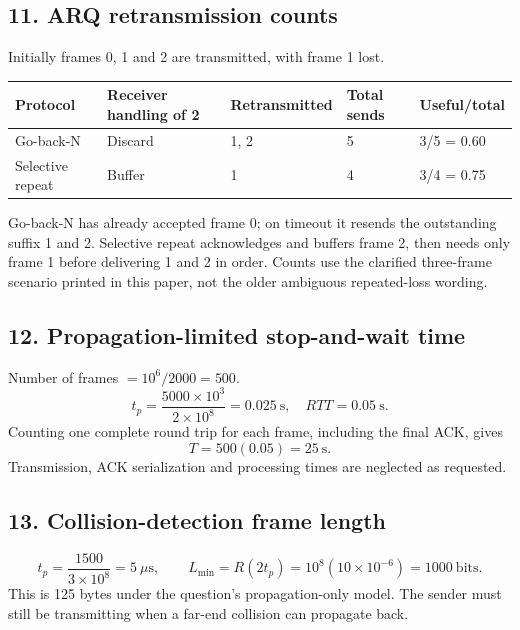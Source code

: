 \documentclass[11pt,a4paper]{article}
\begin{document}
\noindent\begin{minipage}{\linewidth}\subsection*{11. ARQ retransmission counts}

Initially frames 0, 1 and 2 are transmitted, with frame 1 lost.
\begin{center}\renewcommand{\arraystretch}{1.2}\begin{tabular}{lllll}\hline Protocol & Receiver handling of 2 & Retransmitted & Total sends & Useful/total\\\hline
Go-back-N & Discard & 1, 2 & 5 & 3/5 = 0.60\\
Selective repeat & Buffer & 1 & 4 & 3/4 = 0.75\\\hline\end{tabular}\end{center}Go-back-N has already accepted frame 0; on timeout it resends the outstanding suffix 1 and 2. Selective repeat acknowledges and buffers frame 2, then needs only frame 1 before delivering 1 and 2 in order. Counts use the clarified three-frame scenario printed in this paper, not the older ambiguous repeated-loss wording.
\end{minipage}\par\medskip
\noindent\begin{minipage}{\linewidth}\subsection*{12. Propagation-limited stop-and-wait time}

Number of frames $=10^6/2000=500$.
\[t_p=\frac{5000\times10^3}{2\times10^8}=0.025\ \mathrm{s},\quad
RTT=0.05\ \mathrm{s}.\]
Counting one complete round trip for each frame, including the final ACK, gives
\[T=500(0.05)=\boxed{25\ \mathrm{s}}.\]
Transmission, ACK serialization and processing times are neglected as requested.
\end{minipage}\par\medskip
\noindent\begin{minipage}{\linewidth}\subsection*{13. Collision-detection frame length}

\[t_p=\frac{1500}{3\times10^8}=5\ \mu\mathrm{s},\qquad
L_{\min}=R(2t_p)=10^8(10\times10^{-6})=\boxed{1000\ \mathrm{bits}}.\]
This is 125 bytes under the question's propagation-only model. The sender must still be transmitting when a far-end collision can propagate back.
\end{minipage}\par\medskip
\end{document}
